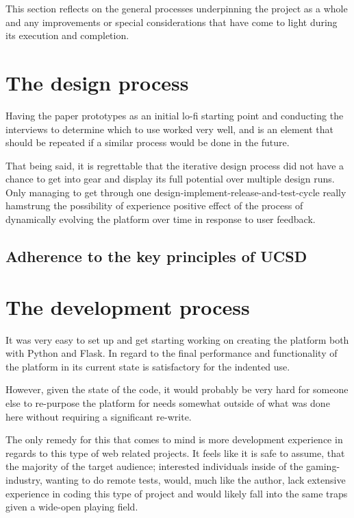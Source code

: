 
This section reflects on the general processes underpinning the project as a
whole and any improvements or special considerations that have come to light
during its execution and completion.

\section{The design process}

  Having the paper prototypes as an initial lo-fi starting point and conducting
  the interviews to determine which to use worked very well, and is an element
  that should be repeated if a similar process would be done in the future.

  That being said, it is regrettable that the iterative design process did not
  have a chance to get into gear and display its full potential over multiple
  design runs. Only managing to get through one
  design-implement-release-and-test-cycle really hamstrung the possibility of
  experience positive effect of the process of dynamically evolving the
  platform over time in response to user feedback.


  \subsection{Adherence to the key principles of UCSD}

\section{The development process}

  It was very easy to set up and get starting working on creating the platform
  both with Python and Flask. In regard to the final performance and
  functionality of the platform in its current state is satisfactory for the
  indented use.

  However, given the state of the code, it would probably be very hard for
  someone else to re-purpose the platform for needs somewhat outside of what
  was done here without requiring a significant re-write.

  The only remedy for this that comes to mind is more development experience in
  regards to this type of web related projects. It feels like it is safe to
  assume, that the majority of the target audience; interested individuals
  inside of the gaming-industry, wanting to do remote tests, would, much like
  the author, lack extensive experience in coding this type of project and
  would likely fall into the same traps given a wide-open playing field.

